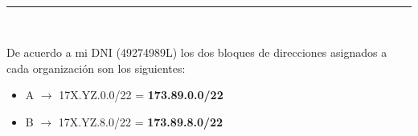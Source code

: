 
\begin{center}
	{\fboxrule=4pt } \\
	\setcounter{chapter}{1}
	\setcounter{section}{0}
	\rule{15cm}{0pt} \\
\end{center}
 
\par De acuerdo a mi DNI (49274989L) los dos bloques de direcciones asignados a cada organización son los siguientes:
\begin{itemize}
	\item A $\rightarrow$ 17X.YZ.0.0/22 = \textbf{173.89.0.0/22}
	\item B $\rightarrow$ 17X.YZ.8.0/22 = \textbf{173.89.8.0/22}
\end{itemize}





\newpage




